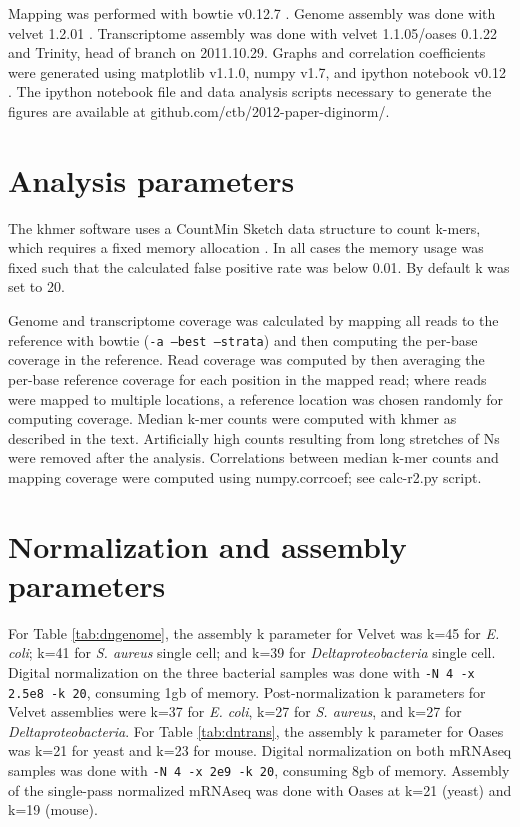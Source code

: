 \documentclass{pnastwo}
\begin{document}
\begin{article}
\begin{materials}
Mapping was performed with bowtie v0.12.7 \cite{pubmed19261174}.
Genome assembly was done with velvet 1.2.01 \cite{pubmed18349386}.
Transcriptome assembly was done with velvet 1.1.05/oases 0.1.22 and
Trinity, head of branch on 2011.10.29.
Graphs and correlation coefficients were generated using matplotlib
v1.1.0, numpy v1.7, and ipython notebook v0.12 \cite{ipython}.  The
ipython notebook file and data analysis scripts necessary to generate
the figures are available at 
  github.com/ctb/2012-paper-diginorm/.


\section{Analysis parameters}

The khmer software uses a CountMin Sketch data structure to count
k-mers, which requires a fixed memory allocation
\cite{countminsketch}.  In all cases the memory usage was fixed such
that the calculated false positive rate was below 0.01.  By default k
was set to 20.

Genome and transcriptome coverage was calculated by mapping all reads
to the reference with bowtie ({\tt -a --best --strata}) and then
computing the per-base coverage in the reference.  Read coverage was
computed by then averaging the per-base reference coverage for each
position in the mapped read; where reads were mapped to multiple
locations, a reference location was chosen randomly for computing
coverage.  Median k-mer counts were computed with khmer as described
in the text.  Artificially high counts resulting from long stretches
of Ns were removed after the analysis.
Correlations between median k-mer counts and mapping coverage were
computed using numpy.corrcoef; see calc-r2.py script.

\section{Normalization and assembly parameters}

For Table \ref{tab:dngenome}, the assembly k parameter for Velvet was
k=45 for {\em E. coli}; k=41 for {\em S. aureus} single cell; and k=39
for {\em Deltaproteobacteria} single cell.  Digital normalization
on the three bacterial samples was done with {\tt -N 4 -x 2.5e8 -k 20},
consuming 1gb of memory.  Post-normalization k parameters for Velvet
assemblies were k=37 for {\em E. coli}, k=27 for {\em S. aureus}, and k=27 for {\em Deltaproteobacteria}.
For Table \ref{tab:dntrans}, the assembly k parameter for Oases was k=21 for yeast
and k=23 for mouse.  Digital normalization on both mRNAseq samples was done
with {\tt -N 4 -x 2e9 -k 20}, consuming 8gb of memory.  Assembly of the
single-pass normalized mRNAseq was done with Oases at k=21 (yeast) and k=19
(mouse).


\end{materials}
\end{article}
\end{document}
